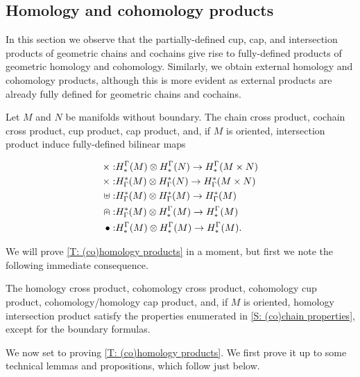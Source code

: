 \subsection{Homology and cohomology products}\label{S: homology products}

In this section we observe that the partially-defined cup, cap, and intersection products of geometric chains and cochains give rise to fully-defined products of geometric homology and cohomology. Similarly, we obtain external homology and cohomology products, although this is more evident as external products are already fully defined for geometric chains and cochains. 

\begin{theorem}\label{T: (co)homology products}
Let $M$ and $N$ be  manifolds without boundary. The chain cross product, cochain cross product, cup product, cap product, and, if $M$ is oriented, intersection product induce fully-defined bilinear maps

\begin{align*}
\times:& H^\Gamma_*(M)\otimes H^\Gamma_*(N)\to H^\Gamma_*(M\times N)\\
\times:& H_\Gamma^*(M)\otimes H_\Gamma^*(N)\to H_\Gamma^*(M\times N)\\
\uplus:& H_\Gamma^*(M)\otimes H_\Gamma^*(M)\to H_\Gamma^*(M)\\
\nplus:& H_\Gamma^*(M)\otimes H^\Gamma_*(M)\to H^\Gamma_*(M)\\
\bullet:& H^\Gamma_*(M)\otimes H^\Gamma_*(M)\to H^\Gamma_*(M).\\
\end{align*}
\end{theorem}

We will prove \cref{T: (co)homology products} in a moment, but first we note the following immediate consequence.
\begin{theorem}
The homology cross product, cohomology  cross product, cohomology cup product, cohomology/homology cap product, and, if $M$ is oriented, homology intersection product satisfy the properties enumerated in \cref{S: (co)chain properties},  except for the boundary formulas. 
\end{theorem}



We now set to proving \cref{T: (co)homology products}. We first prove it up to some technical lemmas and propositions, which follow just below.

